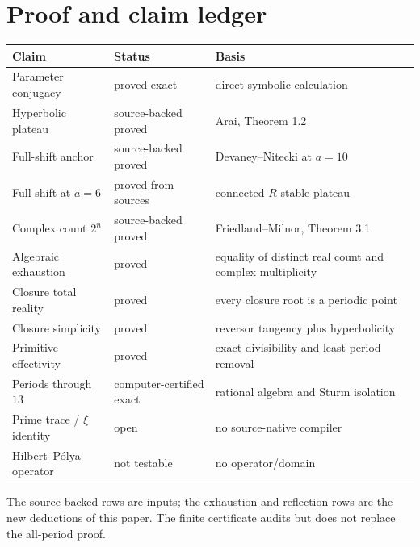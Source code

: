 \section{Proof and claim ledger}

\begin{center}
\begin{tabular}{p{}p{}p{}}
\toprule
Claim & Status & Basis\\
\midrule
Parameter conjugacy & proved exact & direct symbolic calculation\\
Hyperbolic plateau & source-backed proved & Arai, Theorem 1.2\\
Full-shift anchor & source-backed proved & Devaney--Nitecki at $a=10$\\
Full shift at $a=6$ & proved from sources & connected $R$-stable plateau\\
Complex count $2^n$ & source-backed proved & Friedland--Milnor, Theorem 3.1\\
Algebraic exhaustion & proved & equality of distinct real count and complex multiplicity\\
Closure total reality & proved & every closure root is a periodic point\\
Closure simplicity & proved & reversor tangency plus hyperbolicity\\
Primitive effectivity & proved & exact divisibility and least-period removal\\
Periods through $13$ & computer-certified exact & rational algebra and Sturm isolation\\
Prime trace / $\xi$ identity & open & no source-native compiler\\
Hilbert--P\'olya operator & not testable & no operator/domain\\
\bottomrule
\end{tabular}
\end{center}

The source-backed rows are inputs; the exhaustion and reflection rows are the
new deductions of this paper.  The finite certificate audits but does not
replace the all-period proof.
